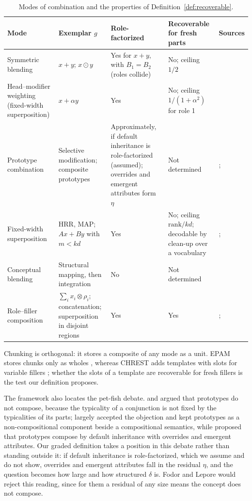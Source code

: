 \documentclass[10pt]{article}
\theoremstyle{plain}
\theoremstyle{remark}
\begin{document}
\begin{table}[h]
  \caption{Modes of combination and the properties of Definition~\ref{def:recoverable}.}
  \label{tab:forms}
  \centering\small
  \begin{tabularx}{\linewidth}{@{}P{2.5cm}P{2.9cm}P{2.2cm}P{2.5cm}Y@{}}
    \toprule
    Mode & Exemplar $g$ & Role-factorized & Recoverable for fresh parts & Sources \\
    \midrule
    Symmetric blending & $x + y$; $x \odot y$ & Yes for $x + y$, with $B_1 = B_2$ (roles collide) & No; ceiling $1/2$ & \citet{mitchell2010} \\
    Head--modifier weighting (fixed-width superposition) & $x + \alpha y$ & Yes & No; ceiling $1/(1+\alpha^2)$ for role 1 & \citet{mitchell2010} \\
    Prototype combination & Selective modification; composite prototypes & Approximately, if default inheritance is role-factorized (assumed); overrides and emergent attributes form $\eta$ & Not determined & \citet{smith1988}; \citet{hampton1987} \\
    Fixed-width superposition & HRR, MAP; $Ax + By$ with $m < kd$ & Yes & No; ceiling $\mathrm{rank}/kd$; decodable by clean-up over a vocabulary & \citet{plate1995,plate2003}; \citet{frady2018} \\
    Conceptual blending & Structural mapping, then integration & No & Not determined & \citet{fauconnier2002} \\
    Role--filler composition & $\sum_i x_i \otimes \rho_i$; concatenation; superposition in disjoint regions & Yes & Yes & \citet{smolensky1990}; \citet{wiedemer2024} \\
    \bottomrule
  \end{tabularx}
\end{table}

\noindent
Chunking is orthogonal: it stores a composite of any mode as a unit. EPAM stores chunks only as wholes \citep{feigenbaum1984}, whereas CHREST adds templates with slots for variable fillers \citep{gobet1996templates,gobet2000}; whether the slots of a template are recoverable for fresh fillers is the test our definition proposes.

The framework also locates the pet-fish debate. \citet{osherson1981} and \citet{fodor1996} argued that prototypes do not compose, because the typicality of a conjunction is not fixed by the typicalities of its parts; \citet{kamp1995} largely accepted the objection and kept prototypes as a non-compositional component beside a compositional semantics, while \citet{hampton1987,hampton2012} proposed that prototypes compose by default inheritance with overrides and emergent attributes. Our graded definition takes a position in this debate rather than standing outside it: if default inheritance is role-factorized, which we assume and do not show, overrides and emergent attributes fall in the residual $\eta$, and the question becomes how large and how structured $\delta$ is. Fodor and Lepore would reject this reading, since for them a residual of any size means the concept does not compose.
\end{document}
